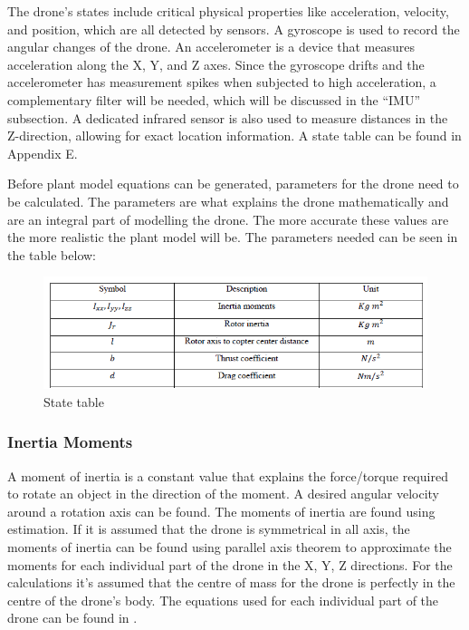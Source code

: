 The drone's states include critical physical properties like acceleration, velocity, and position, which are all detected by sensors. A gyroscope is used to record the angular changes of the drone. An accelerometer is a device that measures acceleration along the X, Y, and Z axes. Since the gyroscope drifts and the accelerometer has measurement spikes when subjected to high acceleration, a complementary filter will be needed, which will be discussed in the “IMU” subsection. A dedicated infrared sensor is also used to measure distances in the Z-direction, allowing for exact location information.
A state table can be found in Appendix E.

Before plant model equations can be generated, parameters for the drone need to be calculated. The parameters are what explains the drone mathematically and are an integral part of modelling the drone. The more accurate these values are the more realistic the plant model will be.
The parameters needed can be seen in the table below:\cite{Ferry}

\begin{figure}[H]
\begin{center}
    \includegraphics[scale =0.9]{pictures/control/parameter table.png}
\end{center}
\caption{State table}
\end{figure}

\subsubsection{Inertia Moments}
A moment of inertia is a constant value that explains the force/torque required to rotate an object in the direction of the moment. A desired angular velocity around a rotation axis can be found. The moments of inertia are found using estimation. If it is assumed that the drone is symmetrical in all axis, the moments of inertia can be found using parallel axis theorem to approximate the moments for each individual part of the drone in the X, Y, Z directions. For the calculations it’s assumed that the centre of mass for the drone is perfectly in the centre of the drone’s body.
The equations used for each individual part of the drone can be found in \cite{Ferry}.

